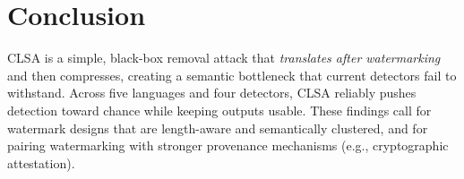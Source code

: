\documentclass{article}
\begin{document}
\section{Conclusion}
CLSA is a simple, black-box removal attack that \emph{translates after watermarking} and then compresses, creating a semantic bottleneck that current detectors fail to withstand. Across five languages and four detectors, CLSA reliably pushes detection toward chance while keeping outputs usable. These findings call for watermark designs that are length-aware and semantically clustered, and for pairing watermarking with stronger provenance mechanisms (e.g., cryptographic attestation).

\begingroup
\small


\endgroup

\appendix
\end{document}
